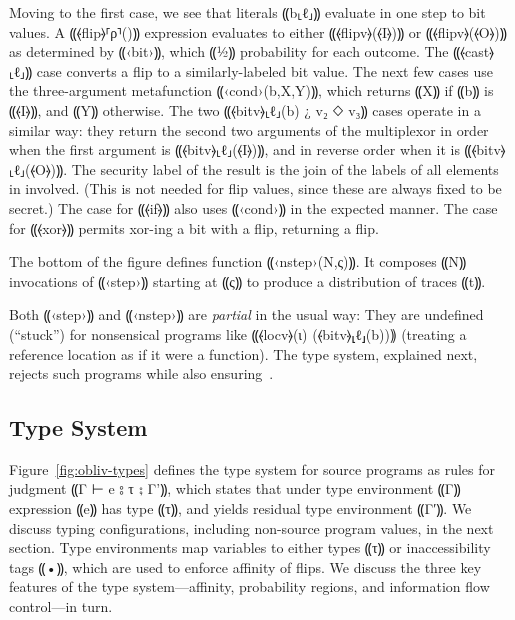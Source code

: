 Moving to the first case, we see that literals ⸨b⸤ℓ⸥⸩ evaluate in one
step to bit values. A ⸨⦑flip⦒⸢ρ⸣()⸩ expression evaluates to either
⸨⦑flipv⦒(⦑I⦒)⸩ or ⸨⦑flipv⦒(⦑O⦒)⸩ as determined by ⸨‹bit›⸩, which ⸨½⸩
probability for each outcome.
%
The ⸨⦑cast⦒⸤ℓ⸥⸩ case converts a flip to a similarly-labeled bit value.
%
The next few cases use the three-argument metafunction ⸨‹cond›(b,X,Y)⸩, which
returns ⸨X⸩ if ⸨b⸩ is ⸨⦑I⦒⸩, and ⸨Y⸩ otherwise.
%
The two ⸨⦑bitv⦒⸤ℓ⸥(b) ¿ v₂ ◇ v₃⸩ cases operate in a similar way: they return the
second two arguments of the multiplexor in order when the first
argument is ⸨⦑bitv⦒⸤ℓ⸥(⦑I⦒)⸩, and in reverse order when it is
⸨⦑bitv⦒⸤ℓ⸥(⦑O⦒)⸩. The security label of the result is the join of the labels of
all elements in involved. (This is not needed for flip values, since these are
always fixed to be secret.)
%
The case for ⸨⦑if⦒⸩ also uses ⸨‹cond›⸩ in the expected manner. The
case for ⸨⦑xor⦒⸩ permits xor-ing a bit with a flip, returning a
flip.

The bottom of the figure defines function ⸨‹nstep›(N,ς)⸩. It composes ⸨N⸩
invocations of ⸨‹step›⸩ starting at ⸨ς⸩ to produce a distribution of traces ⸨t⸩.

Both ⸨‹step›⸩ and ⸨‹nstep›⸩ are \emph{partial} in the usual way:
They are undefined (``stuck'') for nonsensical programs like
⸨⦑locv⦒(ι) (⦑bitv⦒⸤ℓ⸥(b))⸩ (treating a reference location as if it were
a function). The \obliv type system, explained next, rejects
such programs while also ensuring~.


\subsection{Type System}
\label{subsec:obliv-design-types}

Figure~\ref{fig:obliv-types} defines the type system for \obliv source programs
as rules for judgment ⸨Γ ⊢ e ⦂ τ ⨟ Γ'⸩, which states that under type
environment ⸨Γ⸩ expression ⸨e⸩ has type ⸨τ⸩, and yields residual type
environment ⸨Γ′⸩. We discuss typing configurations, including non-source
program values, in the next section. Type environments map variables to either
types ⸨τ⸩ or inaccessibility tags ⸨•⸩, which are used to enforce
affinity of flips. We discuss the three key features of the type
system---affinity, probability regions, and information flow
control---in turn.

